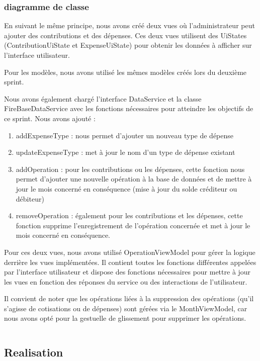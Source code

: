 \subsubsection{diagramme de classe}
En suivant le même principe, nous avons créé deux vues où l'administrateur peut ajouter des contributions et des dépenses. Ces deux vues utilisent des UiStates (ContributionUiState et ExpenseUiState) pour obtenir les données à afficher sur l'interface utilisateur.

Pour les modèles, nous avons utilisé les mêmes modèles créés lors du deuxième sprint.

Nous avons également chargé l'interface DataService et la classe FireBaseDataService avec les fonctions nécessaires pour atteindre les objectifs de ce sprint. Nous avons ajouté :
\begin{enumerate}
  \item addExpenseType : nous permet d'ajouter un nouveau type de dépense
  \item updateExpenseType : met à jour le nom d'un type de dépense existant
  \item addOperation : pour les contributions ou les dépenses, cette fonction nous permet d'ajouter une nouvelle opération à la base de données et de mettre à jour le mois concerné en conséquence (mise à jour du solde créditeur ou débiteur)
  \item removeOperation : également pour les contributions et les dépenses, cette fonction supprime l'enregistrement de l'opération concernée et met à jour le mois concerné en conséquence.
\end{enumerate}
    
Pour ces deux vues, nous avons utilisé OperationViewModel pour gérer la logique derrière les vues implémentées. Il contient toutes les fonctions différentes appelées par l'interface utilisateur et dispose des fonctions nécessaires pour mettre à jour les vues en fonction des réponses du service ou des interactions de l'utilisateur.

Il convient de noter que les opérations liées à la suppression des opérations (qu'il s'agisse de cotisations ou de dépenses) sont gérées via le MonthViewModel, car nous avons opté pour la gestuelle de glissement pour supprimer les opérations.


$ $
\subsection{Realisation}
